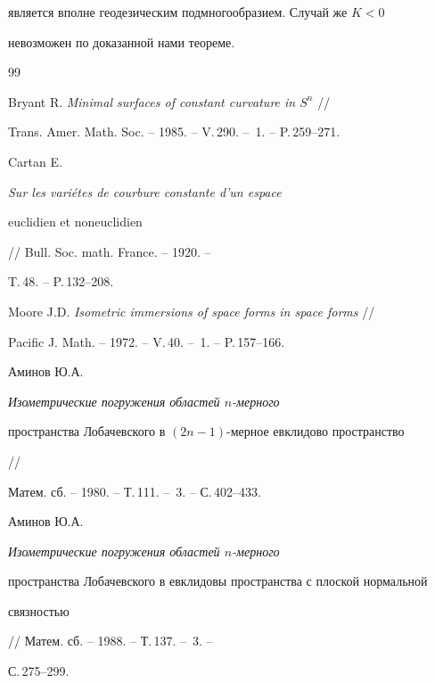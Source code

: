 является вполне геодезическим подмногообразием. Случай же $K<0$ 


невозможен по доказанной нами теореме. 


 


 


\begin{thebibliography}{99} 


 




Bryant R. {\em Minimal surfaces of constant curvature in $S^n$} // 


Trans. Amer. Math. Soc. -- 1985. -- V.\,290. -- \No\,1. -- P.\,259--271. 




Cartan E. {\em Sur les vari\'etes de courbure constante d'un espace 


euclidien et noneuclidien} // Bull. Soc. math. France. -- 1920. -- 


T.\,48. -- P.\,132--208. 




Moore J.D. {\em Isometric immersions of space forms in space forms} // 


Pacific J. Math. -- 1972. -- V.\,40. -- \No\,1. -- P.\,157--166. 




Аминов Ю.А. {\em Изометрические погружения областей $n$-мерного 


пространства Лобачевского в $(2n-1)$-мерное евклидово пространство} // 


Матем. сб. -- 1980. -- Т.\,111. -- \No\,3. -- С.\,402--433. 




Аминов Ю.А. {\em Изометрические погружения областей $n$-мерного 


пространства Лобачевского в евклидовы пространства с плоской нормальной 


связностью} // Матем. сб. -- 1988. -- Т.\,137. -- \No\,3. -- 


С.\,275--299. 


 


\end{thebibliography} 


 


\vskip 0.5cm 


 






 


\label{end} 


 


